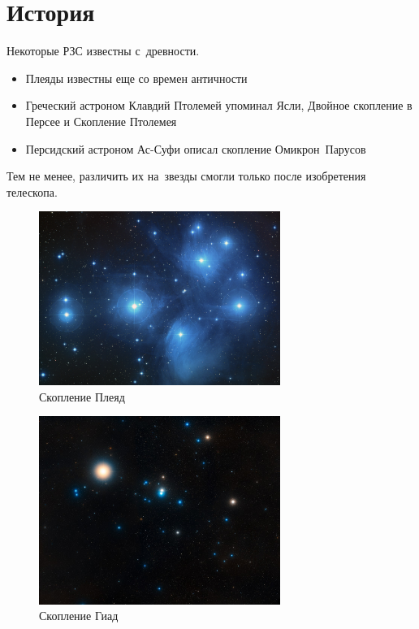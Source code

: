\documentclass{beamer}
\begin{document}
    \section{История}

    \begin{frame}
        Некоторые РЗС известны с~древности.
        \begin{itemize}
            \item Плеяды известны еще со времен античности
            \item Греческий астроном Клавдий Птолемей упоминал Ясли, Двойное скопление в Персее и Скопление Птолемея
            \item Персидский астроном Ас-Суфи описал скопление Омикрон~Парусов
        \end{itemize}
    Тем не менее, различить их на~звезды смогли только после изобретения телескопа.
    \end{frame}
    \begin{frame}
        \begin{figure}
            \centering
            \includegraphics[width=0.7\textwidth]{pictures/Pl.jpg}
            \caption{Скопление Плеяд}
        \end{figure}
    \end{frame}
    \begin{frame}
        \begin{figure}
            \centering
            \includegraphics[width=0.7\textwidth]{pictures/Hyades.jpg}
            \caption{Скопление Гиад}
        \end{figure}
    \end{frame}
\end{document}
